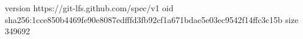version https://git-lfs.github.com/spec/v1
oid sha256:1cce850b4469fe90e8087edfffd3fb92cf1a671bdae5e03ec9542f14ffc3c15b
size 349692
